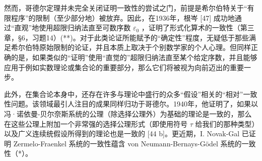 然而，哥德尔定理并未完全关闭证明一致性的尝试之门，前提是希尔伯特关于“有限程序”的限制（至少部分地）被放弃。因此，在1936年，根岑 {[}47{]} 成功地通过“直观”地使用超限归纳法直至可数序数 \(\varepsilon_0\) ，证明了形式化算术的一致性（第三章，§6，习题14）(**)。对于此类论证所能赋予的“确定性”程度，无疑低于那些满足希尔伯特原始限制的论证，并且本质上取决于个别数学家的个人心理。但同样正确的是，如果类似的“证明”使用“直觉的”超限归纳法直至某个给定序数，并且能够应用于例如实数理论或集合论的重要部分，那么它们将被视为向前迈出的重要一步。

此外，在集合论本身中，还存在许多与理论中盛行的众多“假设”相关的“相对”一致性问题。该领域最引人注目的成果同样归功于哥德尔。1940年，他证明了，如果以冯·诺依曼-贝尔奈斯系统的公理（除选择公理外）为基础的理论是一致的，那么在这些公理上附加一个非常强的选择公理形式（即使用符号 \(\tau\) 给我们的那种类型）以及广义连续统假设所得到的理论也是一致的 {[}44 b{]}。更近期，I. Novak-Gal 已证明 Zermelo-Fraenkel 系统的一致性蕴含 von Neumann-Bernays-Gödel 系统的一致性（*）。

